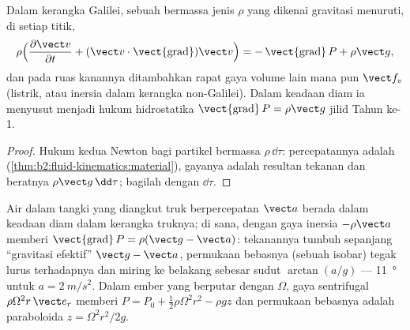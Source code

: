 \begin{theorem}\label{thm:b2:euler-bernoulli:euler}
Dalam kerangka Galilei, sebuah  bermassa jenis $\rho$
yang dikenai gravitasi menuruti, di setiap titik,
\[
\rho\Bigl(\frac{\partial\vect v}{\partial t} + (\vect v\cdot\operatorname{\vect{grad}})
\vect v\Bigr) = -\operatorname{\vect{grad}}P + \rho\vect g ,
\]
dan pada ruas kanannya ditambahkan rapat gaya volume lain mana pun
$\vect f_v$ (listrik, atau inersia dalam kerangka non-Galilei). Dalam
keadaan diam ia menyusut menjadi hukum hidrostatika
$\operatorname{\vect{grad}}P = \rho\vect g$ jilid Tahun ke-1.
\end{theorem}

\begin{proof}
Hukum kedua Newton bagi partikel bermassa $\rho\,\dd\tau$: percepatannya
adalah 
(\cref{thm:b2:fluid-kinematics:material}), gayanya adalah resultan
tekanan dan beratnya $\rho\vect g\,\dd\tau$; bagilah dengan $\dd\tau$.
\end{proof}

\begin{example}\label{ex:b2:euler-bernoulli:tank}
Air dalam tangki yang diangkut truk berpercepatan $\vect a$ berada dalam
keadaan diam dalam kerangka truknya; di sana,  dengan gaya inersia $-\rho\vect a$
memberi $\operatorname{\vect{grad}}P = \rho(\vect g - \vect a)$: tekanannya
tumbuh sepanjang ``gravitasi efektif'' $\vect g - \vect a$, permukaan
bebasnya (sebuah isobar) tegak lurus terhadapnya dan miring ke belakang
sebesar sudut $\arctan(a/g)$ --- \qty{11}{\degree} untuk $a = \qty{2}{m/s^2}$. Dalam
ember yang berputar dengan $\Omega$, gaya sentrifugal $\rho\Omega^2r\,\vect e_r$
memberi $P = P_0 + \tfrac12\rho\Omega^2r^2 - \rho gz$ dan permukaan bebasnya
adalah paraboloida $z = \Omega^2r^2/2g$.
\end{example}

